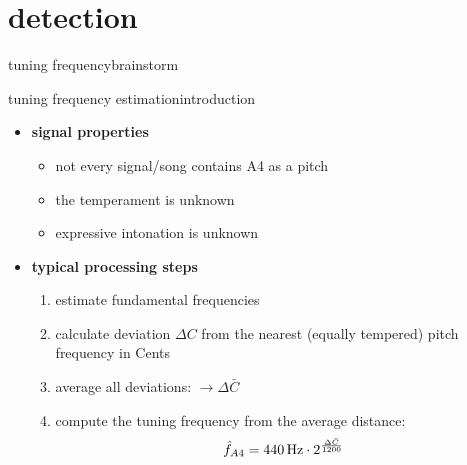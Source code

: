     \section[detection]{detection}
        \begin{frame}{tuning frequency}{brainstorm}
        \end{frame}
	\begin{frame}{tuning frequency estimation}{introduction}
		\begin{itemize}
			\item	\textbf{signal properties}
                \begin{itemize}
                    \item   not every signal/song contains A4 as a pitch
                    \item   the temperament is unknown
                    \item   expressive intonation is unknown
                \end{itemize}
                \pause
            \item   \textbf{typical processing steps}
                \begin{enumerate}
                    \item   estimate fundamental frequencies
                    \pause
                    \item   calculate deviation  $\Delta C$ from the nearest (equally tempered) pitch frequency in Cents
                    \pause
                    \item   average all deviations:  $\rightarrow \Delta \bar{C}$ 
                    \pause
                    \item   compute the tuning frequency from the average distance:
                        \begin{equation*}
                            \hat{f}_{A4} = \unit[440]{Hz} \cdot 2^\frac{\Delta \bar{C}}{1200}
                        \end{equation*}
                \end{enumerate}
		\end{itemize}
	\end{frame}
